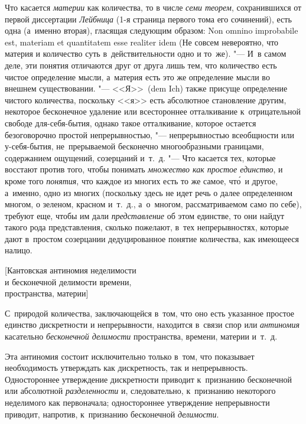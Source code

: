 Что касается {\em материи} как количества, то в числе {\em семи теорем},
сохранившихся от первой диссертации {\em Лейбница} (1-я страница первого тома его сочинений), есть одна
(а~именно вторая), гласящая следующим образом: Non omnino impro\-babi\-le est,
mate\-riam et quanti\-tatem esse reali\-ter idem (Не совсем невероятно, что
материя и количество суть в~действительности одно и то~же). "--- И~в самом
деле, эти понятия отличаются друг от друга лишь тем, что количество есть
чистое определение мысли, а~материя есть это же определение мысли во внешнем
существовании. "--- <<Я>>~(dem Ich) также присуще определение чистого
количества, поскольку <<я>> есть абсолютное становление другим, некоторое
бесконечное удаление или всестороннее отталкивание к~отрицательной свободе
для-себя-бытия, однако такое отталкивание, которое остается безоговорочно
простой непрерывностью, "--- непрерывностью всеобщности или у-себя-бытия,
не~прерываемой бесконечно многообразными границами, содержанием ощущений,
созерцаний и~т.~д. "--- Что касается тех, которые восстают против того, чтобы
понимать {\em множество как простое единство}, и кроме того {\em понятия}, что
каждое из многих есть то же самое, чт\'{о}~и другое, а~именно, одно из многих
(поскольку здесь не идет речь о далее определенном многом, о зеленом, красном
и~т.~д., а~о~многом, рассматриваемом само по себе), требуют еще, чтобы им дали
{\em представление} об этом единстве, то они найдут такого рода представления,
сколько пожелают, в~тех непрерывностях, которые дают в~простом созерцании
дедуцированное понятие количества, как имеющееся налицо.

%
{[Кантовская антиномия неделимости\\и бесконечной делимости времени,\\
пространства, материи]}

\label{bkm:bm88a}С~природой количества, заключающейся в~том, что оно есть
указанное простое единство дискретности и непрерывности, находится в~связи спор
или {\em антиномия} касательно {\em бесконечной делимости} пространства,
времени, материи и~т.~д.

Эта антиномия состоит исключительно только в~том, что показывает необходимость
утверждать как дискретность, так и непрерывность. Одностороннее утверждение
дискретности приводит к~признанию бесконечной или абсолютной
{\em разделенности} и, следовательно, к~признанию некоторого неделимого как
первоначала; одностороннее утверждение непрерывности приводит, напротив,
к~признанию бесконечной {\em делимости}.

